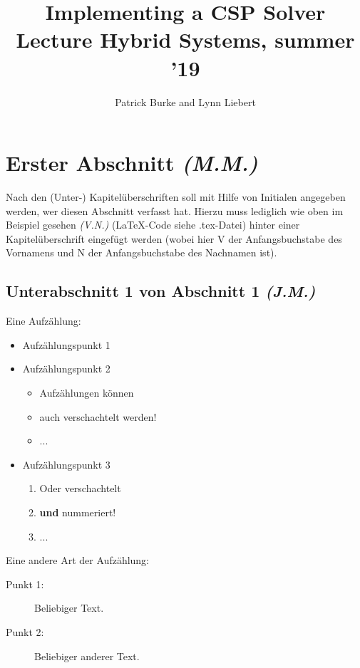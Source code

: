 \documentclass{article}
\title{Implementing a CSP Solver\\\small{Lecture Hybrid Systems, summer '19}}
\author{Patrick Burke and Lynn Liebert}
\newcommand{\initials}[1]{\small{\textit{(#1)}} \normalsize}
\begin{document}
\maketitle %

\listoftodos

\begin{abstract}
\end{abstract}

\tableofcontents
\newpage


\newpage








\section{Erster Abschnitt \initials{M.M.}}
Nach den (Unter-) Kapitelüberschriften soll mit Hilfe von Initialen angegeben werden, wer diesen Abschnitt verfasst hat. Hierzu muss lediglich wie oben im Beispiel gesehen \initials{V.N.} (LaTeX-Code siehe .tex-Datei) hinter einer Kapitelüberschrift eingefügt werden (wobei hier V der Anfangsbuchstabe des Vornamens und N der Anfangsbuchstabe des Nachnamen ist). 
\subsection{Unterabschnitt 1 von Abschnitt 1 \initials{J.M.}}
Eine Aufzählung:
\begin{itemize}
    \item Aufzählungspunkt 1
    \item Aufzählungspunkt 2
	\begin{itemize}
	    \item Aufzählungen können 
	    \item auch verschachtelt werden!
	    \item ...
	\end{itemize}    
    \item Aufzählungspunkt 3
	\begin{enumerate}
	    \item Oder verschachtelt
	    \item \textbf{und} nummeriert!
	    \item ...
	\end{enumerate}
\end{itemize}
Eine andere Art der Aufzählung:
\begin{description}
    \item[Punkt 1: ] Beliebiger Text.
    \item[Punkt 2: ] Beliebiger anderer Text.
\end{description}
\end{document}
